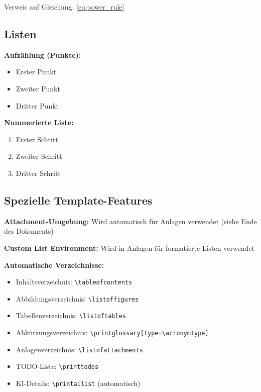 \documentclass[../main.tex]{subfiles}
\begin{document}
Verweis auf Gleichung: \cref{eq:power_rule}


\subsection{Listen}

\textbf{Aufzählung (Punkte):}
\begin{itemize}
    \item Erster Punkt
    \item Zweiter Punkt
    \item Dritter Punkt
\end{itemize}

\textbf{Nummerierte Liste:}
\begin{enumerate}
    \item Erster Schritt
    \item Zweiter Schritt
    \item Dritter Schritt
\end{enumerate}


\subsection{Spezielle Template-Features}

\textbf{Attachment-Umgebung:}
Wird automatisch für Anlagen verwendet (siehe Ende des Dokuments)

\textbf{Custom List Environment:}
Wird in Anlagen für formatierte Listen verwendet

\textbf{Automatische Verzeichnisse:}
\begin{itemize}
    \item Inhaltsverzeichnis: \verb|\tableofcontents|
    \item Abbildungsverzeichnis: \verb|\listoffigures|
    \item Tabellenverzeichnis: \verb|\listoftables|
    \item Abkürzungsverzeichnis: \verb|\printglossary[type=\acronymtype]|
    \item Anlagenverzeichnis: \verb|\listofattachments|
    \item TODO-Liste: \verb|\printtodos|
    \item KI-Details: \verb|\printailist| (automatisch)
\end{itemize}
\end{document}
